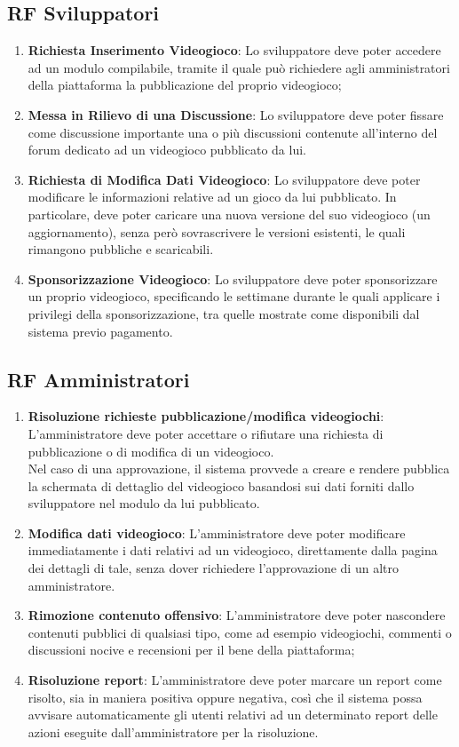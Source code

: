 \subsection{RF Sviluppatori}
\begin{enumerate}
	\item \textbf{Richiesta Inserimento Videogioco}: Lo sviluppatore deve poter accedere ad un modulo compilabile, tramite il quale può richiedere agli amministratori della piattaforma la pubblicazione del proprio videogioco;
	\item \textbf{Messa in Rilievo di una Discussione}: Lo sviluppatore deve poter fissare come discussione importante una o più discussioni contenute all’interno del forum dedicato ad un videogioco pubblicato da lui.
	\item \textbf{Richiesta di Modifica Dati Videogioco}: Lo sviluppatore deve poter modificare le informazioni relative ad un gioco da lui pubblicato. In particolare, deve poter caricare una nuova versione del suo videogioco (un aggiornamento), senza però sovrascrivere le versioni esistenti, le quali rimangono pubbliche e scaricabili.
	\item \textbf{Sponsorizzazione Videogioco}: Lo sviluppatore deve poter sponsorizzare un proprio videogioco, specificando le settimane durante le quali applicare i privilegi della sponsorizzazione, tra quelle mostrate come disponibili dal sistema previo pagamento.	
\end{enumerate}

\subsection{RF Amministratori}
\begin{enumerate}
	\item \textbf{Risoluzione richieste pubblicazione/modifica videogiochi}: L’amministratore deve poter accettare o rifiutare una richiesta di pubblicazione o di modifica di un videogioco.
	\\Nel caso di una approvazione, il sistema provvede a creare e rendere pubblica la schermata di dettaglio del videogioco basandosi sui dati forniti dallo sviluppatore nel modulo da lui pubblicato.
	\item \textbf{Modifica dati videogioco}: L’amministratore deve poter modificare immediatamente i dati relativi ad un videogioco, direttamente dalla pagina dei dettagli di tale, senza dover richiedere l’approvazione di un altro amministratore.
	\item \textbf{Rimozione contenuto offensivo}: L’amministratore deve poter nascondere contenuti pubblici di qualsiasi tipo, come ad esempio videogiochi, commenti o discussioni nocive e recensioni per il bene della piattaforma;
	\item \textbf{Risoluzione report}: L’amministratore deve poter marcare un report come risolto, sia in maniera positiva oppure negativa, così che il sistema possa avvisare automaticamente gli utenti relativi ad un determinato report delle azioni eseguite dall’amministratore per la risoluzione.	
\end{enumerate}

